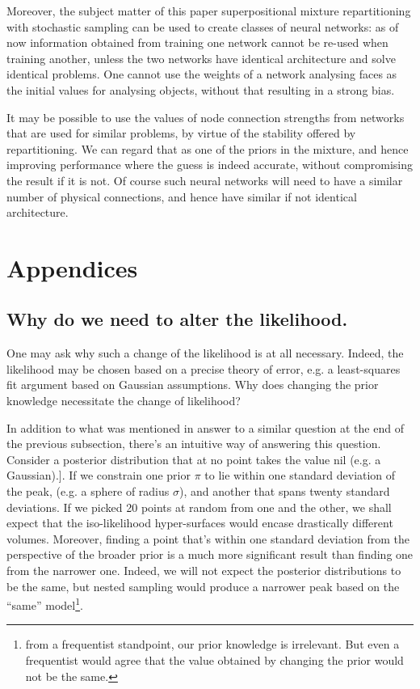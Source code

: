 \documentclass[usenatbib]{mnras}
\begin{document}
Moreover, the subject matter of this paper superpositional mixture
repartitioning with stochastic sampling can be used to create
classes of neural networks: as of now information obtained from
training one network cannot be re-used when training another,
unless the two networks have identical architecture and solve
identical problems. One cannot use the weights of a network
analysing faces as the initial values for analysing objects,
without that resulting in a strong bias. 

It may be possible to use the values of node connection strengths
from networks that are used for similar problems, by virtue of the
stability offered by repartitioning. We can regard that as one of
the priors in the mixture, and hence improving performance where
the guess is indeed accurate, without compromising the result if it
is not. Of course such neural networks will need to have a similar
number of physical connections, and hence have similar if not
identical architecture.

 


\section{Appendices}
\label{sec:orga373c4b}

\subsection{Why do we need to alter the likelihood. \label{sec:repart-necessity}}
\label{sec:org41ee8ab}
One may ask why such a change of the likelihood is at all
necessary. Indeed, the likelihood may be chosen based on a precise
theory of error, e.g. a least-squares fit argument based on
Gaussian assumptions. Why does changing the prior knowledge
necessitate the change of likelihood?

In addition to what was mentioned in answer to a similar question
at the end of the previous subsection, there's an intuitive way of
answering this question. Consider a posterior distribution that at
no point takes the value nil (e.g. a Gaussian).]. If we constrain one
prior \(\pi\) to lie within one standard deviation of the peak,
(e.g. a sphere of radius \(\sigma\)), and another that spans twenty
standard deviations. If we picked 20 points at random from one and
the other, we shall expect that the iso-likelihood hyper-surfaces
would encase drastically different volumes. Moreover, finding a
point that's within one standard deviation from the perspective of
the broader prior is a much more significant result than finding
one from the narrower one. Indeed, we will not expect the posterior
distributions to be the same, but nested sampling would produce a
narrower peak based on the ``same'' model\footnote{from a   frequentist standpoint, our prior knowledge is irrelevant. But even   a frequentist would agree that the value obtained by changing the   prior would not be the same.}. 
\end{document}
